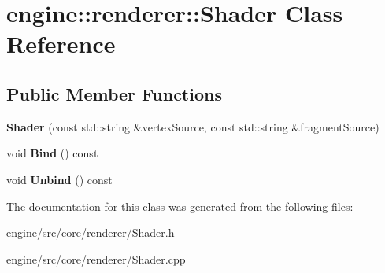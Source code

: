 \hypertarget{classengine_1_1renderer_1_1Shader}{}\section{engine\+:\+:renderer\+:\+:Shader Class Reference}
\label{classengine_1_1renderer_1_1Shader}
\subsection*{Public Member Functions}
\begin{DoxyCompactItemize}
\item
\mbox{\label{classengine_1_1renderer_1_1Shader_a48fb2f9ae7b37051093275c2ecbbae9e}}
{\bfseries Shader} (const std\+::string \&vertex\+Source, const std\+::string \&fragment\+Source)
\item
\mbox{\label{classengine_1_1renderer_1_1Shader_ada9e74af27cf5dec958de71bc6aa0366}}
void {\bfseries Bind} () const
\item
\mbox{\label{classengine_1_1renderer_1_1Shader_aa129bc5d8c6fb821eacd9ebab21793b6}}
void {\bfseries Unbind} () const
\end{DoxyCompactItemize}


The documentation for this class was generated from the following files\+:\begin{DoxyCompactItemize}
\item
engine/src/core/renderer/Shader.\+h\item
engine/src/core/renderer/Shader.\+cpp\end{DoxyCompactItemize}
